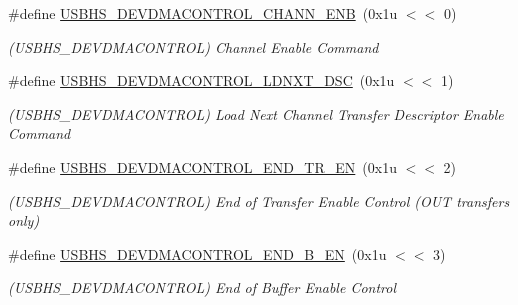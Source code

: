 \begin{DoxyCompactItemize}
\mbox{\label{group__SAME70__USBHS_gafc5eaec12bce454e6829bdfc4c4594a5}} 
\#define \mbox{\hyperlink{group__SAME70__USBHS_gafc5eaec12bce454e6829bdfc4c4594a5}{U\+S\+B\+H\+S\+\_\+\+D\+E\+V\+D\+M\+A\+C\+O\+N\+T\+R\+O\+L\+\_\+\+C\+H\+A\+N\+N\+\_\+\+E\+NB}}~(0x1u $<$$<$ 0)
\begin{DoxyCompactList}\small\item\em (U\+S\+B\+H\+S\+\_\+\+D\+E\+V\+D\+M\+A\+C\+O\+N\+T\+R\+OL) Channel Enable Command \end{DoxyCompactList}\item 
\mbox{\label{group__SAME70__USBHS_ga90c878919619dac6d5c5042f75a54653}} 
\#define \mbox{\hyperlink{group__SAME70__USBHS_ga90c878919619dac6d5c5042f75a54653}{U\+S\+B\+H\+S\+\_\+\+D\+E\+V\+D\+M\+A\+C\+O\+N\+T\+R\+O\+L\+\_\+\+L\+D\+N\+X\+T\+\_\+\+D\+SC}}~(0x1u $<$$<$ 1)
\begin{DoxyCompactList}\small\item\em (U\+S\+B\+H\+S\+\_\+\+D\+E\+V\+D\+M\+A\+C\+O\+N\+T\+R\+OL) Load Next Channel Transfer Descriptor Enable Command \end{DoxyCompactList}\item 
\mbox{\label{group__SAME70__USBHS_ga4a472d5573d59ca01ab998d35fe42134}} 
\#define \mbox{\hyperlink{group__SAME70__USBHS_ga4a472d5573d59ca01ab998d35fe42134}{U\+S\+B\+H\+S\+\_\+\+D\+E\+V\+D\+M\+A\+C\+O\+N\+T\+R\+O\+L\+\_\+\+E\+N\+D\+\_\+\+T\+R\+\_\+\+EN}}~(0x1u $<$$<$ 2)
\begin{DoxyCompactList}\small\item\em (U\+S\+B\+H\+S\+\_\+\+D\+E\+V\+D\+M\+A\+C\+O\+N\+T\+R\+OL) End of Transfer Enable Control (O\+UT transfers only) \end{DoxyCompactList}\item 
\mbox{\label{group__SAME70__USBHS_ga36a6018ba094d2c25e1e5d43fbf81725}} 
\#define \mbox{\hyperlink{group__SAME70__USBHS_ga36a6018ba094d2c25e1e5d43fbf81725}{U\+S\+B\+H\+S\+\_\+\+D\+E\+V\+D\+M\+A\+C\+O\+N\+T\+R\+O\+L\+\_\+\+E\+N\+D\+\_\+\+B\+\_\+\+EN}}~(0x1u $<$$<$ 3)
\begin{DoxyCompactList}\small\item\em (U\+S\+B\+H\+S\+\_\+\+D\+E\+V\+D\+M\+A\+C\+O\+N\+T\+R\+OL) End of Buffer Enable Control \end{DoxyCompactList}\item 

\end{DoxyCompactItemize}
